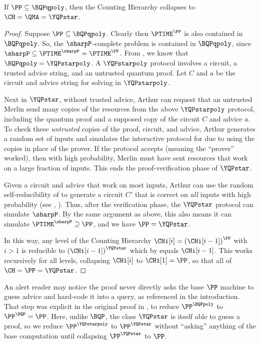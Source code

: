 \begin{theorem}\label{thm:main}
	If $\PP \subseteq \BQPqpoly$, then the Counting Hierarchy collapses to
	$\CH = \QMA = \YQPstar$.
\end{theorem}

\begin{proof}
	Suppose $\PP \subseteq \BQPqpoly$.
	Clearly then $\PTIME^\PP$ is also contained in $\BQPqpoly$.
	So, the $\sharpP$-complete problem \perm{} is contained in $\BQPqpoly$, since $\sharpP\subseteq \PTIME^\sharpP=\PTIME^\PP$.
	From \cite{aaronson2014full}, we know that
	$\BQPqpoly=\YQPstarpoly$.
	A $\YQPstarpoly$ protocol involves a circuit, a trusted advice string, and an untrusted quantum proof.
	Let $C$ and $a$ be the circuit and advice string for solving \perm{} in $\YQPstarpoly$.
	
	Next in $\YQPstar$, without trusted advice, 
	Arthur can request that an untrusted Merlin
	send many copies of the resources from the above $\YQPstarpoly$ protocol,
	including the quantum proof
	and a supposed copy of the circuit $C$ and advice $a$.
	To check these \emph{untrusted} copies of the proof, circuit, and advice,
	Arthur generates a random set of inputs and
	simulates the interactive protocol for \perm{} due to \cite{lund1992algebraic}
	using the copies in place of the prover.
	If the protocol accepts (meaning the ``prover'' worked),
	then with high probability, Merlin must have sent resources that work on a large fraction of inputs.
	This ends the proof-verification phase of $\YQPstar$.
	
	Given a circuit and advice that work on most inputs,
	Arthur can use the random self-reducibility of
	 to generate a circuit $C'$ that is correct on \emph{all} inputs with high probability
	(see \eg{}, \cite[Sec. 8.6.2]{arora2009computational}).
	Thus, after the verification phase, the $\YQPstar$ protocol can simulate $\sharpP$.
	By the same argument as above, this also means it can simulate $\PTIME^\sharpP \supseteq \PP$, 
	and we have $\PP = \YQPstar$.
	
	In this way, any level of the Counting Hierarchy
	$\CHi[i] = \left(\CHi[i-1]\right)^\PP$ with $i>1$ is reducible to
	$\left(\CHi[i-1]\right)^{\YQPstar}$
	which by  equals $\CHi[i-1]$.
	This works recursively for all levels, collapsing $\CHi[i]$ to $\CHi[1]=\PP$,
	so that all of $\CH=\PP=\YQPstar$.
\end{proof}

An alert reader may notice the proof never directly asks the base $\PP$ machine to
guess advice and hard-code it into a query, as referenced in the introduction.
That step was explicit in the original proof %
in \cite{aaronson_subtle}, %
to reduce $\PP^\BQPpoly$ to $\PP^\BQP=\PP$.
Here, unlike $\BQP$, the class $\YQPstar$ is itself able to guess a proof,
so we reduce $\PP^\YQPstarpoly$ to $\PP^\YQPstar$ without ``asking'' anything of the
base computation until collapsing $\PP^\YQPstar$ to $\PP$.

